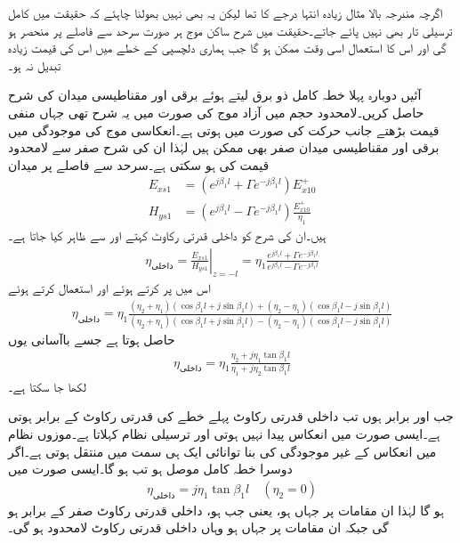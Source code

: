 اگرچہ مندرجہ بالا مثال زیادہ انتہا درجے کا تھا لیکن یہ بھی نہیں بھولنا چاہئے کہ حقیقت میں کامل ترسیلی تار بھی نہیں پائے جاتے۔حقیقت میں شرح ساکن موج ہر صورت سرحد سے فاصلے پر منحصر ہو گی اور اس کا استعمال اسی وقت ممکن ہو گا جب ہماری دلچسپی کے خطے میں اس کی قیمت زیادہ تبدیل نہ ہو۔   

آئیں دوبارہ پہلا خطہ کامل ذو برق لیتے ہوئے برقی اور مقناطیسی میدان کی شرح حاصل کریں۔لامحدود حجم میں آزاد موج کی صورت میں یہ شرح  تھی جہاں منفی قیمت بڑھتے  جانب حرکت کی صورت میں ہوتی ہے۔انعکاسی موج کی موجودگی میں برقی اور مقناطیسی میدان صفر بھی ممکن ہیں لہٰذا ان کی شرح صفر سے لامحدود قیمت کی ہو سکتی ہے۔سرحد سے  فاصلے پر میدان
 \begin{align*}
E_{xs1}&=\left(e^{j \beta_1 l}+ \Gamma e^{-j \beta_1 l} \right)E_{x10}^+ \\
H_{ys1}&=\left(e^{j \beta_1 l}- \Gamma e^{-j \beta_1 l} \right) \frac{E_{x10}^+}{\eta_1}
\end{align*}
ہیں۔ان کی شرح کو داخلی قدرتی رکاوٹ کہتے اور  سے ظاہر کیا جاتا ہے۔
\begin{align*}
\eta_{\text{داخلی}}=\left. \frac{E_{xs1}}{H_{ys1}} \right|_{z=-l}=\eta_1 \frac{e^{j \beta_1 l}+ \Gamma e^{-j \beta_1 l}}{e^{j \beta_1 l}- \Gamma e^{-j \beta_1 l}}
\end{align*}
اس میں  پر کرتے ہوئے اور   استعمال کرتے ہوئے
\begin{align*}
\eta_{\text{داخلی}}=\eta_1 \frac{(\eta_2+\eta_1)(\cos \beta_1 l +j \sin \beta_1 l)+(\eta_2-\eta_1)(\cos \beta_1 l -j \sin \beta_1 l)}{(\eta_2+\eta_1)(\cos \beta_1 l +j \sin \beta_1 l)-(\eta_2-\eta_1)(\cos \beta_1 l -j \sin \beta_1 l)}
\end{align*}
حاصل ہوتا ہے  جسے باآسانی یوں
\begin{align}\label{مساوات+موج_ترسیلی_نظام_داخلی_قدرتی_رکاوٹ_تعریف}
\eta_{\text{داخلی}}=\eta_1 \frac{\eta_2 +j \eta_1 \tan \beta_1 l}{\eta_1+j \eta_2 \tan \beta_1 l}
\end{align}
لکھا جا سکتا ہے۔

جب  اور  برابر ہوں تب داخلی قدرتی رکاوٹ  پہلے خطے کی قدرتی رکاوٹ  کے برابر ہوتی ہے۔ایسی صورت میں انعکاس پیدا نہیں ہوتی اور  ترسیلی نظام  کہلاتا ہے۔موزوں نظام میں انعکاس کے غیر موجودگی کی بنا توانائی ایک ہی سمت میں منتقل ہوتی ہے۔اگر دوسرا خطہ کامل موصل ہو تب  ہو گا۔ایسی صورت میں
\begin{align}
\eta_{\text{داخلی}}=j \eta_1 \tan \beta_1 l \quad (\eta_2=0)
\end{align}
ہو گا لہٰذا ان مقامات پر جہاں  ہو، یعنی جب  ہو، داخلی قدرتی رکاوٹ صفر کے برابر ہو گی جبکہ ان مقامات پر جہاں  ہو وہاں داخلی قدرتی رکاوٹ لامحدود ہو گی۔

